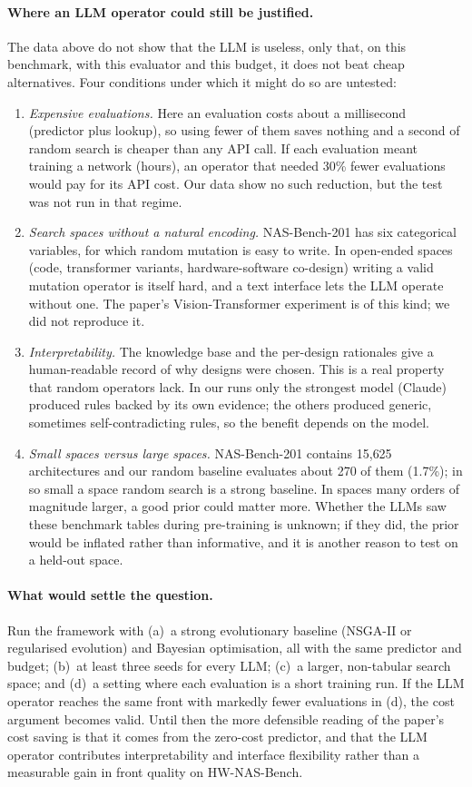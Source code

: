 \documentclass[11pt,a4paper]{article}
\begin{document}
\paragraph{Where an LLM operator could still be justified.} The data above do not show that the LLM is useless, only that, on this benchmark, with this evaluator and this budget, it does not beat cheap alternatives. Four conditions under which it might do so are untested:
\begin{enumerate}[nosep]
  \item \emph{Expensive evaluations.} Here an evaluation costs about a millisecond (predictor plus lookup), so using fewer of them saves nothing and a second of random search is cheaper than any API call. If each evaluation meant training a network (hours), an operator that needed 30\% fewer evaluations would pay for its API cost. Our data show no such reduction, but the test was not run in that regime.
  \item \emph{Search spaces without a natural encoding.} NAS-Bench-201 has six categorical variables, for which random mutation is easy to write. In open-ended spaces (code, transformer variants, hardware-software co-design) writing a valid mutation operator is itself hard, and a text interface lets the LLM operate without one. The paper's Vision-Transformer experiment is of this kind; we did not reproduce it.
  \item \emph{Interpretability.} The knowledge base and the per-design rationales give a human-readable record of why designs were chosen. This is a real property that random operators lack. In our runs only the strongest model (Claude) produced rules backed by its own evidence; the others produced generic, sometimes self-contradicting rules, so the benefit depends on the model.
  \item \emph{Small spaces versus large spaces.} NAS-Bench-201 contains 15{,}625 architectures and our random baseline evaluates about 270 of them (1.7\%); in so small a space random search is a strong baseline. In spaces many orders of magnitude larger, a good prior could matter more. Whether the LLMs saw these benchmark tables during pre-training is unknown; if they did, the prior would be inflated rather than informative, and it is another reason to test on a held-out space.
\end{enumerate}

\paragraph{What would settle the question.} Run the framework with (a)~a strong evolutionary baseline (NSGA-II or regularised evolution) and Bayesian optimisation, all with the same predictor and budget; (b)~at least three seeds for every LLM; (c)~a larger, non-tabular search space; and (d)~a setting where each evaluation is a short training run. If the LLM operator reaches the same front with markedly fewer evaluations in (d), the cost argument becomes valid. Until then the more defensible reading of the paper's cost saving is that it comes from the zero-cost predictor, and that the LLM operator contributes interpretability and interface flexibility rather than a measurable gain in front quality on HW-NAS-Bench.
\end{document}
